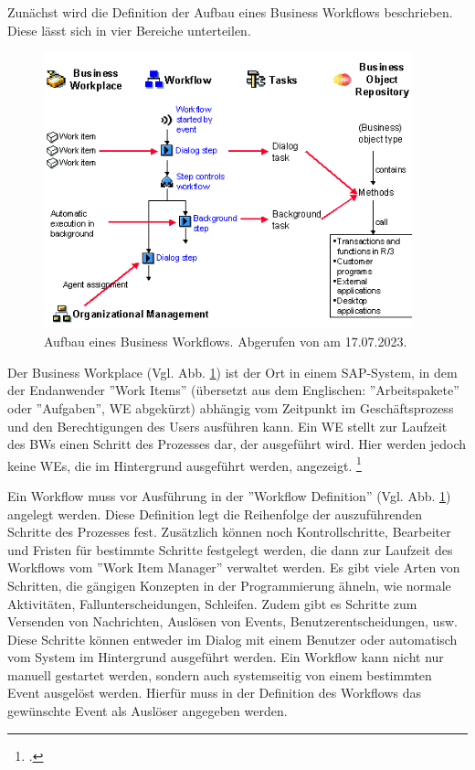 Zunächst wird die Definition der Aufbau eines Business Workflows beschrieben. Diese lässt sich in vier Bereiche unterteilen.

\begin{figure}[H]
 \centering
 \includegraphics[height=8cm]{Bilder/Business-Workflows_Schema.png}
 \caption[Aufbau eines Business Workflows]{Aufbau eines Business Workflows. Abgerufen von \cite{sap_business-workflows_2022-1} am 17.07.2023.}
 \label{fig:iso_norm_Business_Workflows}
\end{figure}


Der Business Workplace (Vgl. Abb. \ref{fig:iso_norm_Business_Workflows}) ist der Ort in einem SAP-System, in dem der Endanwender ''Work Items'' (übersetzt aus dem Englischen: ''Arbeitspakete'' oder ''Aufgaben'', WE abgekürzt) abhängig vom Zeitpunkt im Geschäftsprozess und den Berechtigungen des Users ausführen kann. Ein WE stellt zur Laufzeit des BWs einen Schritt des Prozesses dar, der ausgeführt wird. Hier werden jedoch keine WEs, die im Hintergrund ausgeführt werden, angezeigt. \footcite[Vgl.][]{sap_business-workflows_2022-1}

Ein Workflow muss vor Ausführung in der ''Workflow Definition'' (Vgl. Abb. \ref{fig:iso_norm_Business_Workflows}) angelegt werden. Diese Definition legt die Reihenfolge der auszuführenden Schritte des Prozesses fest. Zusätzlich können noch Kontrollschritte, Bearbeiter und Fristen für bestimmte Schritte festgelegt werden, die dann zur Laufzeit des Workflows vom ''Work Item Manager'' verwaltet werden. Es gibt viele Arten von Schritten, die gängigen Konzepten in der Programmierung ähneln, wie \zB normale Aktivitäten, Fallunterscheidungen, Schleifen. Zudem gibt es Schritte zum Versenden von Nachrichten, Auslösen von Events, Benutzerentscheidungen, usw. Diese Schritte können entweder im Dialog mit einem Benutzer oder automatisch vom System im Hintergrund ausgeführt werden. Ein Workflow kann nicht nur manuell gestartet werden, sondern auch systemseitig von einem bestimmten Event ausgelöst werden. Hierfür muss in der Definition des Workflows das gewünschte Event als Auslöser angegeben werden.

